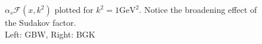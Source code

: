 \documentclass[11pt]{article}
\begin{document}
\begin{figure}[t]
\caption{$\alpha_s\mathcal{F}(x,k^2)$ plotted for $k^2=1\mathrm{GeV^2}$. Notice the broadening effect of the Sudakov factor.\\Left: GBW, Right: BGK}
\label{fig:gluon-x}
\end{figure}
\end{document}
